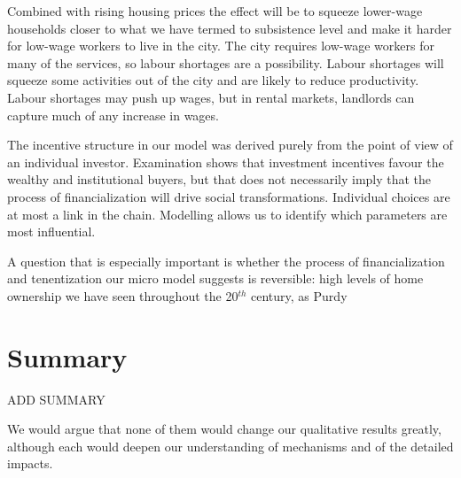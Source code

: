 Combined with rising housing prices the effect will be to squeeze lower-wage households closer to what we have termed to subsistence level and make it harder for low-wage workers to live in the city. The city requires low-wage workers for many of the services, so labour shortages are a possibility. Labour shortages will squeeze some activities out of the city and are likely to reduce productivity. Labour shortages may push up wages, but in rental markets, landlords can capture much of any increase in wages. 

The incentive structure in our model was derived purely from the point of view of an individual investor. Examination shows that investment incentives favour the wealthy and institutional buyers, but that does not necessarily imply that the process of financialization will drive social transformations. Individual choices are at most  a link in the chain. Modelling  allows us to identify which parameters are most influential. 

A question that is especially important is whether the process of financialization and tenentization our micro model suggests is reversible:  high levels of home ownership we have seen throughout the 20$^{th}$ century, as Purdy 


\section{Summary}

ADD SUMMARY

We would argue that none of them would change our qualitative results greatly, although each would deepen our understanding of mechanisms and of the detailed impacts.


